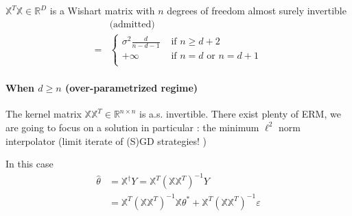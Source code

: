 $ \mathbb{X}^T \mathbb{X} \in \mathbb{R}^D $ is a Wishart matrix with $ n $ degrees of freedom almost surely invertible 
\begin{align*}
    &\text{(admitted)} \\
    =& \begin{cases}
        \sigma ^2 \frac{d}{n - d - 1} &\text{ if } n \geq d + 2 \\
        +\infty &\text{ if } n = d \text{ or } n = d+1 \\
    \end{cases} 
\end{align*}

\paragraph[]{When $d \geq n$ (over-parametrized regime)} The kernel matrix $\mathbb{X}\mathbb{X}^T \in \mathbb{R}^{n \times n}$ is a.s. invertible. There exist plenty of ERM, we are going to focus on a solution in particular : the minimum $\ell^2 $ norm interpolator (limit iterate of (S)GD strategies! )

In this case \begin{align*}
    \hat{\theta } &= \mathbb{X}^\dag Y = \mathbb{X}^T (\mathbb{X} \mathbb{X}^T)^{-1} Y \\
    &= \mathbb{X}^T (\mathbb{X}\mathbb{X}^T)^{-1} \mathbb{X} \theta^\ast + \mathbb{X}^T (\mathbb{X}\mathbb{X}^T)^{-1} \varepsilon 
\end{align*}


